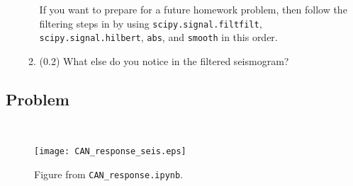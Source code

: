 \documentclass[11pt,titlepage,fleqn]{article}
\newcommand{\tfileresponse}{{\tt CAN\_response.ipynb}}
\begin{document}
\begin{enumerate}
\begin{enumerate}
If you want to prepare for a future homework problem, then follow the filtering steps in \citet{Ni2005} by using \verb+scipy.signal.filtfilt+, \verb+scipy.signal.hilbert+, \verb+abs+, and \verb+smooth+ in this order.

\item (0.2) What else do you notice in the filtered seismogram?
\end{enumerate}

\end{enumerate}


\subsection*{Problem} \howmuchtime\




%

\begin{figure}
\hspace{-1cm}
\texttt{[image: CAN\_response\_seis.eps]}
\caption[]
{{
Figure from \tfileresponse.
}}
\label{fig:seis}
\end{figure}

\end{document}
